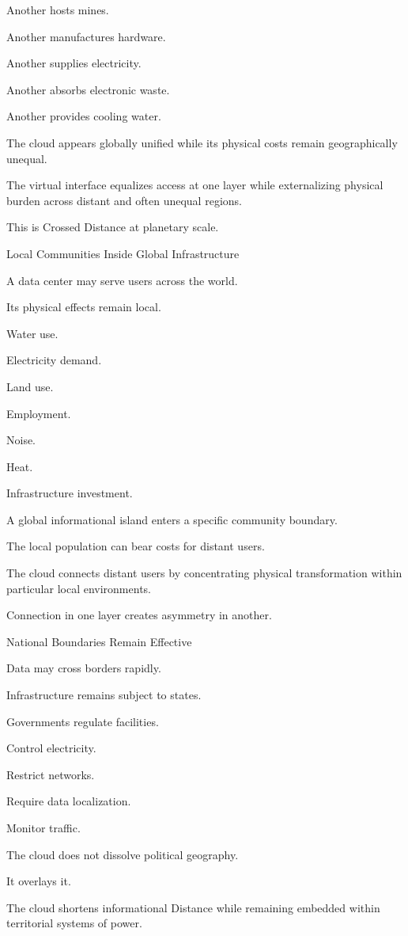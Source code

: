 Another hosts mines.

Another manufactures hardware.

Another supplies electricity.

Another absorbs electronic waste.

Another provides cooling water.

The cloud appears globally unified while its physical costs remain geographically unequal.

The virtual interface equalizes access at one layer while externalizing physical burden across distant and often unequal regions.

This is Crossed Distance at planetary scale.

Local Communities Inside Global Infrastructure

A data center may serve users across the world.

Its physical effects remain local.

Water use.

Electricity demand.

Land use.

Employment.

Noise.

Heat.

Infrastructure investment.

A global informational island enters a specific community boundary.

The local population can bear costs for distant users.

The cloud connects distant users by concentrating physical transformation within particular local environments.

Connection in one layer creates asymmetry in another.

National Boundaries Remain Effective

Data may cross borders rapidly.

Infrastructure remains subject to states.

Governments regulate facilities.

Control electricity.

Restrict networks.

Require data localization.

Monitor traffic.

The cloud does not dissolve political geography.

It overlays it.

The cloud shortens informational Distance while remaining embedded within territorial systems of power.

